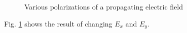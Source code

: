 \begin{figure}[htpb]
	\centering
	\caption{Various polarizations of a propagating electric field}
	\label{fig:polarization}
\end{figure}

Fig. \ref{fig:polarization} shows the result of changing $E_x$ and $E_y$. 
